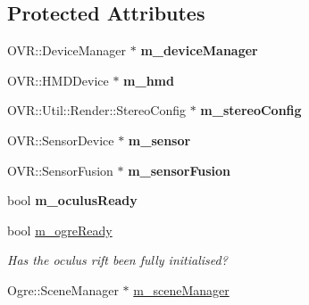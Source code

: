 \subsection*{\-Protected \-Attributes}
\begin{DoxyCompactItemize}
\item 
\hypertarget{classOculus_a7d43a3c841aa6c2992bc221a2478abce}{\-O\-V\-R\-::\-Device\-Manager $\ast$ {\bfseries m\-\_\-device\-Manager}}\label{classOculus_a7d43a3c841aa6c2992bc221a2478abce}

\item 
\hypertarget{classOculus_a4a51d56710b55e8e120e78c7873d63ed}{\-O\-V\-R\-::\-H\-M\-D\-Device $\ast$ {\bfseries m\-\_\-hmd}}\label{classOculus_a4a51d56710b55e8e120e78c7873d63ed}

\item 
\hypertarget{classOculus_a808e6236420bb27f20efab835cebd297}{\-O\-V\-R\-::\-Util\-::\-Render\-::\-Stereo\-Config $\ast$ {\bfseries m\-\_\-stereo\-Config}}\label{classOculus_a808e6236420bb27f20efab835cebd297}

\item 
\hypertarget{classOculus_a6b7deac9a91f5cd60da0bde86de0a2de}{\-O\-V\-R\-::\-Sensor\-Device $\ast$ {\bfseries m\-\_\-sensor}}\label{classOculus_a6b7deac9a91f5cd60da0bde86de0a2de}

\item 
\hypertarget{classOculus_a743d46cc9f7111e8a2e217225ae668b5}{\-O\-V\-R\-::\-Sensor\-Fusion $\ast$ {\bfseries m\-\_\-sensor\-Fusion}}\label{classOculus_a743d46cc9f7111e8a2e217225ae668b5}

\item 
\hypertarget{classOculus_af1bce77bc8933b499925ee2842d08a2b}{bool {\bfseries m\-\_\-oculus\-Ready}}\label{classOculus_af1bce77bc8933b499925ee2842d08a2b}

\item 
\hypertarget{classOculus_ad88758400d60938fb7d74da9ab805ffe}{bool \hyperlink{classOculus_ad88758400d60938fb7d74da9ab805ffe}{m\-\_\-ogre\-Ready}}\label{classOculus_ad88758400d60938fb7d74da9ab805ffe}

\begin{DoxyCompactList}\small\item\em \-Has the oculus rift been fully initialised? \end{DoxyCompactList}\item 
\hypertarget{classOculus_abf5ac2474b1aa243ae840467b9463b0a}{\-Ogre\-::\-Scene\-Manager $\ast$ \hyperlink{classOculus_abf5ac2474b1aa243ae840467b9463b0a}{m\-\_\-scene\-Manager}}\label{classOculus_abf5ac2474b1aa243ae840467b9463b0a}


\end{DoxyCompactItemize}
